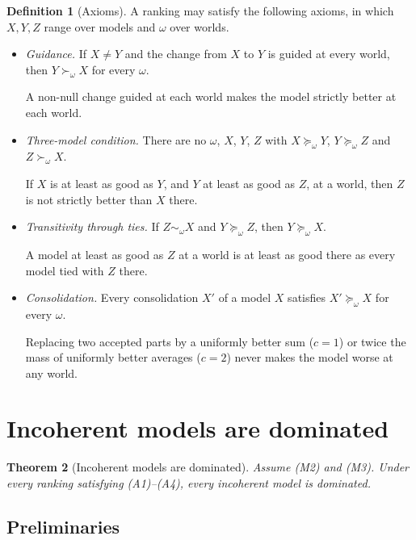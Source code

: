 \documentclass[11pt]{article}
\newtheorem{theorem}{Theorem}[section]
\theoremstyle{definition}
\newtheorem{definition}[theorem]{Definition}
\begin{document}
\begin{definition}[Axioms]\label{def:axioms}
A ranking may satisfy the following axioms, in which $X,Y,Z$ range over models and $\omega$ over worlds.
\begin{itemize}[leftmargin=3em]
\item[(A1)] \emph{Guidance.} If $X\ne Y$ and the change from $X$ to $Y$ is guided at every world, then $Y\succ_\omega X$ for every $\omega$.

A non-null change guided at each world makes the model strictly better at each world.
\item[(A2)] \emph{Three-model condition.} There are no $\omega$, $X$, $Y$, $Z$ with $X\succeq_\omega Y$, $Y\succeq_\omega Z$ and $Z\succ_\omega X$.

If $X$ is at least as good as $Y$, and $Y$ at least as good as $Z$, at a world, then $Z$ is not strictly better than $X$ there.
\item[(A3)] \emph{Transitivity through ties.} If $Z\sim_\omega X$ and $Y\succeq_\omega Z$, then $Y\succeq_\omega X$.

A model at least as good as $Z$ at a world is at least as good there as every model tied with $Z$ there.
\item[(A4)] \emph{Consolidation.} Every consolidation $X'$ of a model $X$ satisfies $X'\succeq_\omega X$ for every $\omega$.

Replacing two accepted parts by a uniformly better sum ($c=1$) or twice the mass of uniformly better averages ($c=2$) never makes the model worse at any world.
\end{itemize}
\end{definition}

\section{Incoherent models are dominated}\label{sec:dominance}

\begin{theorem}[Incoherent models are dominated]\label{thm:dominance}
Assume (M2) and (M3). Under every ranking satisfying (A1)--(A4), every incoherent model is dominated.
\end{theorem}

\subsection{Preliminaries}
\end{document}
